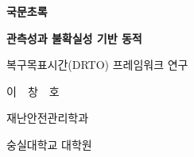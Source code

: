 
\clearpage
{}

{\fontsize{16}{20}\selectfont\bfseries 국문초록}\par
\vspace{15mm}  %

\begin{center}
  \begin{minipage}{0.9\textwidth}
    \centering
    {\fontsize{16}{20}\selectfont\bfseries
    관측성과 불확실성 기반 동적\par
    복구목표시간(DRTO) 프레임워크 연구
    }\par
  \end{minipage}
\end{center}
\vspace{15mm}  %

\begin{flushright}
  \hspace*{-2cm}
  {\fontsize{14}{22}\selectfont
    \setlength{\baselineskip}{22pt}
    이\ \ 창\ \ 호\par
    재난안전관리학과\par
    숭실대학교 대학원\par
  }
\end{flushright}

\vspace{15mm}  %

